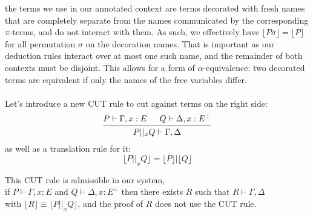 \documentclass[a4paper,12pt]{article}
\begin{document}
\remark the terms we use in our annotated context are terms decorated with fresh names that are completely separate from the names communicated by the corresponding $\pi$-terms, and do not interact with them. As such, we effectively have $\lfloor P\sigma \rfloor = \lfloor P \rfloor$ for all permutation $\sigma$ on the decoration names. That is important as our deduction rules interact over at most one such name, and the remainder of both contexts must be disjoint. This allows for a form of $\alpha$-equivalence: two decorated terms are equivalent if only the names of the free variables differ.\\~\\
Let's introduce a new CUT rule to cut against terms on the right side:
\[\begin{prooftree}\hypo{P \vdash \Gamma,x:E}
	\hypo{Q \vdash \Delta,x:E^\bot}
	\infer2{P||_xQ \vdash \Gamma,\Delta}\end{prooftree}\]
as well as a translation rule for it:
\[ \lfloor P||_xQ \rfloor = \lfloor P \rfloor | \lfloor Q \rfloor \]
\newpage
\begin{proposition}
This CUT rule is admissible in our system, \ie\\
if $P \vdash \Gamma,x:E$ and $Q \vdash \Delta,x:E^\bot$ then there exists $R$ such that $R \vdash \Gamma,\Delta$\\
with $\lfloor R \rfloor \equiv \lfloor P||_xQ \rfloor$, and the proof of $R$ does not use the CUT rule.
\end{proposition}
\end{document}
